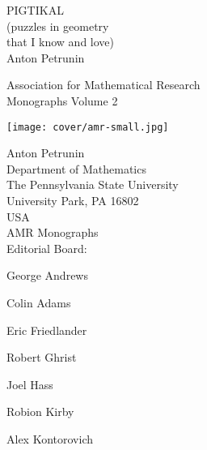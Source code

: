 \documentclass[twoside]{book}
\begin{document}


\begin{titlepage}
\selectfont  
    \vspace*{4.5\baselineskip}
    \centering

\centering
\vspace*{3mm}
{\huge PIGTIKAL} \\[0em]
{\huge (puzzles in geometry\\
that I know and love)}\\[14mm]
{\Large Anton Petrunin} 
\par
\vspace*{55mm}
{\large Association for Mathematical Research\\[0mm]
Monographs Volume 2}
\par
\vspace*{14mm}
\texttt{[image: cover/amr-small.jpg]}
\end{titlepage}

\noindent
Anton Petrunin\\
Department of Mathematics\\
The Pennsylvania State University\\
University Park, PA 16802\\
USA\\[20mm]
\noindent
AMR Monographs\\
Editorial Board:

\qquad George Andrews

\qquad Colin Adams

\qquad 
Eric Friedlander

\qquad 
Robert Ghrist

\qquad 
Joel Hass

\qquad 
Robion Kirby

\qquad 
Alex Kontorovich
\end{document}
